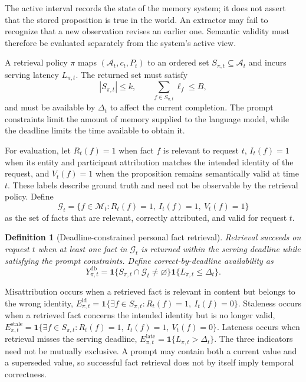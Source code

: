 \documentclass[letterpaper]{article} %
\newtheorem{definition}{Definition}
\begin{document}
The active interval records the state of the memory system; it does not assert that the stored proposition is true in the world. An extractor may fail to recognize that a new observation revises an earlier one. Semantic validity must therefore be evaluated separately from the system's active view.

A retrieval policy $\pi$ maps $(\mathcal{A}_t,c_t,P_t)$ to an ordered set $S_{\pi,t}\subseteq\mathcal{A}_t$ and incurs serving latency $L_{\pi,t}$. The returned set must satisfy
\begin{equation}
|S_{\pi,t}|\le k, \qquad \sum_{f\in S_{\pi,t}}\ell_f\le B,
\end{equation}
and must be available by $\Delta_t$ to affect the current completion. The prompt constraints limit the amount of memory supplied to the language model, while the deadline limits the time available to obtain it.

For evaluation, let $R_t(f)=1$ when fact $f$ is relevant to request $t$, $I_t(f)=1$ when its entity and participant attribution matches the intended identity of the request, and $V_t(f)=1$ when the proposition remains semantically valid at time $t$. These labels describe ground truth and need not be observable by the retrieval policy. Define
\begin{equation}
\mathcal{G}_t=\{f\in\mathcal{M}_t:R_t(f)=1,\ I_t(f)=1,\ V_t(f)=1\}
\end{equation}
as the set of facts that are relevant, correctly attributed, and valid for request $t$.

\begin{definition}[Deadline-constrained personal fact retrieval]
Retrieval succeeds on request $t$ when at least one fact in $\mathcal{G}_t$ is returned within the serving deadline while satisfying the prompt constraints. Define correct-by-deadline availability as
\begin{equation}
Y^{\mathrm{db}}_{\pi,t}=\mathbf{1}\{S_{\pi,t}\cap\mathcal{G}_t\neq\varnothing\}\mathbf{1}\{L_{\pi,t}\le\Delta_t\}.
\end{equation}
\end{definition}

Misattribution occurs when a retrieved fact is relevant in content but belongs to the wrong identity, $E^{\mathrm{id}}_{\pi,t}=\mathbf{1}\{\exists f\in S_{\pi,t}:R_t(f)=1,\ I_t(f)=0\}$. Staleness occurs when a retrieved fact concerns the intended identity but is no longer valid, $E^{\mathrm{stale}}_{\pi,t}=\mathbf{1}\{\exists f\in S_{\pi,t}:R_t(f)=1,\ I_t(f)=1,\ V_t(f)=0\}$. Lateness occurs when retrieval misses the serving deadline, $E^{\mathrm{late}}_{\pi,t}=\mathbf{1}\{L_{\pi,t}>\Delta_t\}$. The three indicators need not be mutually exclusive. A prompt may contain both a current value and a superseded value, so successful fact retrieval does not by itself imply temporal correctness.
\end{document}
